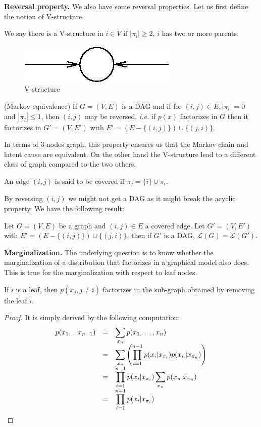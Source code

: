 \documentclass[12pt]{report}
\begin{document}
\textbf{Reversal property. }We also have some reversal properties. Let us first define the notion of V-structure.
\begin{definition}
We say there is a V-structure in $i\in V$ if $| \pi_i|\geq 2$, \ie $i$ has two or more parents.
\end{definition}
\begin{figure}[h!]
\centering
\includegraphics[scale = 1]{vstruct.eps}
\caption{V-structure}
\label{fig4}
\end{figure}
\begin{proposition}
(Markov equivalence) If $G = (V,E)$ is a DAG and if for $(i,j)\in E, | \pi_i| = 0$ and $|\pi_j| \leq 1$, then $(i,j)$ may be reversed, \emph{i.e.} if $p(x)$ factorizes in $G$ then it factorizes in $G' = (V,E')$ with $E' = (E-\{(i,j)\})\cup \{ (j,i)\}$.
\end{proposition}
In terms of 3-nodes graph, this property ensures us that the Markov chain and latent cause are equivalent. On the other hand the V-structure lead to a different class of graph compared to the two others.
\begin{definition}
An edge $(i,j)$ is said to be covered if $\pi_j = \{i \}\cup \pi_i$. 
\end{definition}
By reversing $(i,j)$ we might not get a DAG as it might break the acyclic property. We have the following result:
\begin{proposition}
Let $G = (V,E)$ be a graph and $(i,j)\in E$ a covered edge. Let $G'= (V,E')$ with $E' = (E-\{(i,j)\})\cup \{ (j,i)\}$, then if $G'$ is a DAG, $\mathcal{L}(G) = \mathcal{L}(G')$.
\end{proposition}

\textbf{Marginalization. }The underlying question is to know whether the marginalization of a distribution that factorizes in a graphical model also does. This is true for the marginalization with respect to leaf nodes.
\begin{proposition}
If $i$ is a leaf, then $p(x_j, j \neq i)$ factorizes in the sub-graph obtained by removing the leaf $i$.
\end{proposition}
\begin{proof}
It is simply derived by the following computation:
\begin{equation*}
\begin{array}{r l l}
   p(x_1,...x_{n-1}) & = & \displaystyle \sum_{x_n}{p(x_1,\ldots,x_n)}\\
                     & = & \displaystyle \sum_{x_n}{\left(\prod_{i=1}^{n-1}{p(x_{i}|x_{\pi_i})} p(x_n|x_{\pi_n})\right)}\\
										 & = & \displaystyle \prod_{i=1}^{n-1}{p(x_{i}|x_{\pi_i})}\sum_{x_n}{p(x_n|x_{\pi_n})}\\
                     & = & \displaystyle \prod_{i=1}^{n-1}{p(x_{i}|x_{\pi_i})}
\end{array}
\end{equation*}
\end{proof}
\end{document}
